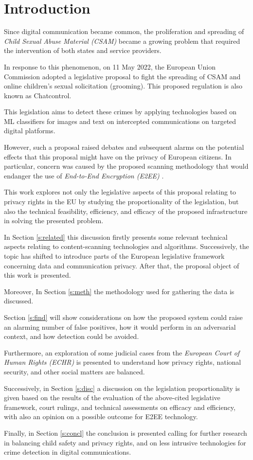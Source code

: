 \section{Introduction}

Since digital communication became common, the proliferation and spreading of \textit{Child Sexual Abuse Material (CSAM)} became a growing problem that required the intervention of both states and service providers. 

In response to this phenomenon, on 11 May 2022, the European Union Commission adopted a legislative proposal to fight the spreading of CSAM and online children's sexual solicitation (grooming)\cite{eu2023chatcontrol}. This proposed regulation is also known as Chatcontrol.

This legislation aims to detect these crimes by applying technologies based on ML classifiers for images and text on intercepted communications on targeted digital platforms. 

However, such a proposal raised debates and subsequent alarms on the potential effects that this proposal might have on the privacy of European citizens. In particular, concern was caused by the proposed scanning methodology that would endanger the use of \textit{End-to-End Encryption (E2EE)} \cite{effects}.

This work explores not only the legislative aspects of this proposal relating to privacy rights in the EU by studying the proportionality of the legislation, but also the technical feasibility, efficiency, and efficacy of the proposed infrastructure in solving the presented problem.

In Section \ref{s:related} this discussion firstly presents some relevant technical aspects relating to content-scanning technologies and algorithms. Successively, the topic has shifted to introduce parts of the European legislative framework concerning data and communication privacy. After that, the proposal object of this work is presented.

Moreover, In Section \ref{s:meth} the methodology used for gathering the data is discussed.

Section \ref{s:find} will show considerations on how the proposed system could raise an alarming number of false positives, how it would perform in an adversarial context, and how detection could be avoided.

Furthermore, an exploration of some judicial cases from the \textit{European Court of Human Rights (ECHR)} is presented to understand how privacy rights, national security, and other social matters are balanced.

Successively, in Section \ref{s:disc} a discussion on the legislation proportionality is given based on the results of the evaluation of the above-cited legislative framework, court rulings, and technical assessments on efficacy and efficiency, with also an opinion on a possible outcome for E2EE technology.

Finally, in Section \ref{s:concl} the conclusion is presented calling for further research in balancing child safety and privacy rights, and on less intrusive technologies for crime detection in digital communications.